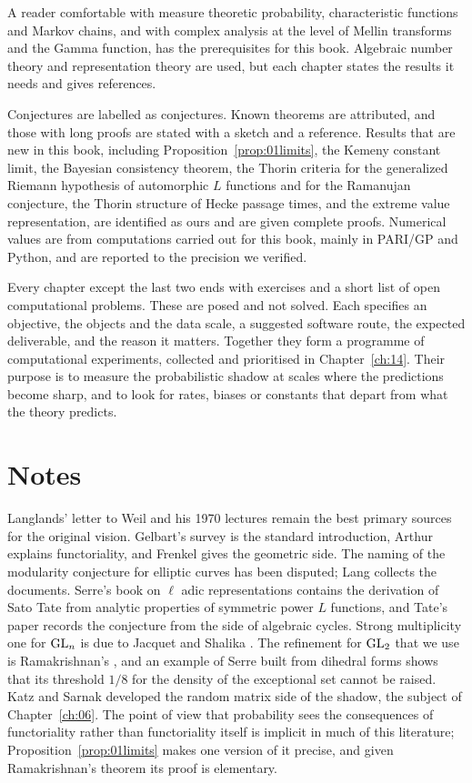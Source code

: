 A reader comfortable with measure theoretic probability, characteristic functions and Markov chains, and with complex analysis at the level of Mellin transforms and the Gamma function, has the prerequisites for this book. Algebraic number theory and representation theory are used, but each chapter states the results it needs and gives references.

Conjectures are labelled as conjectures. Known theorems are attributed, and those with long proofs are stated with a sketch and a reference. Results that are new in this book, including Proposition~\ref{prop:01limits}, the Kemeny constant limit, the Bayesian consistency theorem, the Thorin criteria for the generalized Riemann hypothesis of automorphic $L$ functions and for the Ramanujan conjecture, the Thorin structure of Hecke passage times, and the extreme value representation, are identified as ours and are given complete proofs. Numerical values are from computations carried out for this book, mainly in PARI/GP and Python, and are reported to the precision we verified.

Every chapter except the last two ends with exercises and a short list of open computational problems. These are posed and not solved. Each specifies an objective, the objects and the data scale, a suggested software route, the expected deliverable, and the reason it matters. Together they form a programme of computational experiments, collected and prioritised in Chapter~\ref{ch:14}. Their purpose is to measure the probabilistic shadow at scales where the predictions become sharp, and to look for rates, biases or constants that depart from what the theory predicts.

\section{Notes}

Langlands' letter to Weil \cite{langlands1967} and his 1970 lectures \cite{langlands1970} remain the best primary sources for the original vision. Gelbart's survey \cite{gelbart1984} is the standard introduction, Arthur \cite{arthur2003} explains functoriality, and Frenkel \cite{frenkel2007} gives the geometric side. The naming of the modularity conjecture for elliptic curves has been disputed; Lang \cite{lang1995} collects the documents. Serre's book on $\ell$ adic representations \cite{serre1968} contains the derivation of Sato Tate from analytic properties of symmetric power $L$ functions, and Tate's paper \cite{tate1965} records the conjecture from the side of algebraic cycles. Strong multiplicity one for $\mathrm{GL}_n$ is due to Jacquet and Shalika \cite{jacquetshalika1981}. The refinement for $\mathrm{GL}_2$ that we use is Ramakrishnan's \cite{ramakrishnan1994}, and an example of Serre built from dihedral forms shows that its threshold $1/8$ for the density of the exceptional set cannot be raised. Katz and Sarnak \cite{katzsarnak1999,katzsarnak1999b} developed the random matrix side of the shadow, the subject of Chapter~\ref{ch:06}. The point of view that probability sees the consequences of functoriality rather than functoriality itself is implicit in much of this literature; Proposition~\ref{prop:01limits} makes one version of it precise, and given Ramakrishnan's theorem its proof is elementary.

